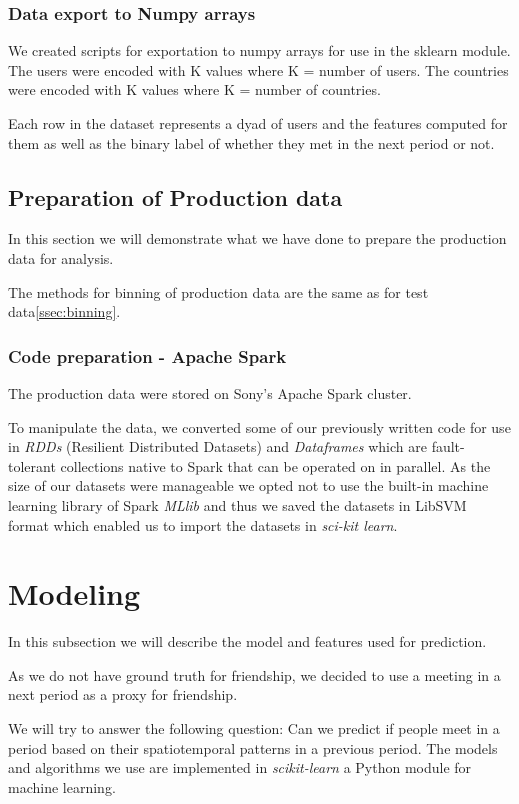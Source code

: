 \subsubsection{Data export to Numpy arrays}
We created scripts for exportation to numpy arrays for use in the sklearn module. The users were encoded with K values where K = number of users. The countries were encoded with K values where K = number of countries.

Each row in the dataset represents a dyad of users and the features computed for them as well as the binary label of whether they met in the next period or not.

\subsection{Preparation of Production data}
In this section we will demonstrate what we have done to prepare the production data for analysis.

The methods for binning of production data are the same as for test data\ref{ssec:binning}.

\subsubsection{Code preparation - Apache Spark}
The production data were stored on Sony's Apache Spark\cite{spark} cluster.

To manipulate the data, we converted some of our previously written code for use in \textit{RDDs} (Resilient Distributed Datasets) and \textit{Dataframes} which are fault-tolerant collections native to Spark that can be operated on in parallel.
As the size of our datasets were manageable we opted not to use the built-in machine learning library of Spark \textit{MLlib} and thus we saved the datasets in LibSVM format which enabled us to import the datasets in \textit{sci-kit learn}.

\section{Modeling}
In this subsection we will describe the model and features used for prediction.

As we do not have ground truth for friendship, we decided to use a meeting in a next period as a proxy for friendship.

We will try to answer the following question: Can we predict if people meet in a period based on their spatiotemporal patterns in a previous period.
The models and algorithms we use are implemented in \textit{scikit-learn}\cite{scikit-learn} a Python module for machine learning.

